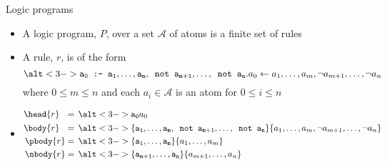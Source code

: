 \begin{frame}{Logic programs}
  \label{eqn:rule}
  \begin{itemize}
  \item <1->
    A \alert{logic program}, $P$, over a set $\mathcal{A}$ of atoms is a finite \alert{set} of rules
  \item <1->
    A \alert{rule}, $r$, is of the form
    \[
      \alt<3->{\tt a_0\texttt{ :- } a_1,\dots,a_m,\texttt{ not }{a_{m+1}},\dots,\texttt{ not }{a_n}.}%
                  {a_0 \leftarrow   a_1,\dots,a_m,         \neg a_{m+1},\dots,         \neg a_n}
    \]
    where $0\leq m\leq n$ and each $a_i\in{\mathcal{A}}$ is an atom for $0\leq i\leq n$
    \medskip
  \item <2->
    \begin{align*}
      \head{r}\phantom{^+}   &=\, \alt<3->{\mathtt{a_0}}{a_0}
      \\
      \body{r}\phantom{^+}   &=\, \alt<3->{\tt\{a_1,\dots,a_m,\texttt{ not }{a_{m+1}},\dots,\texttt{ not }{a_n}\}}%
                                          {\{a_1,\dots,a_m,          \neg a_{m+1},\dots,          \neg a_n\}}
      \\
      \pbody{r}              &=\, \alt<3->{\tt\{a_1,\dots,a_m\}}{\{a_1,\dots,a_m\}}
      \\
      \nbody{r}              &=\, \alt<3->{\tt\{a_{m+1},\dots,a_n\}}{\{a_{m+1},\dots,a_n\}}
    \end{align*}%
  \end{itemize}
\end{frame}
%
